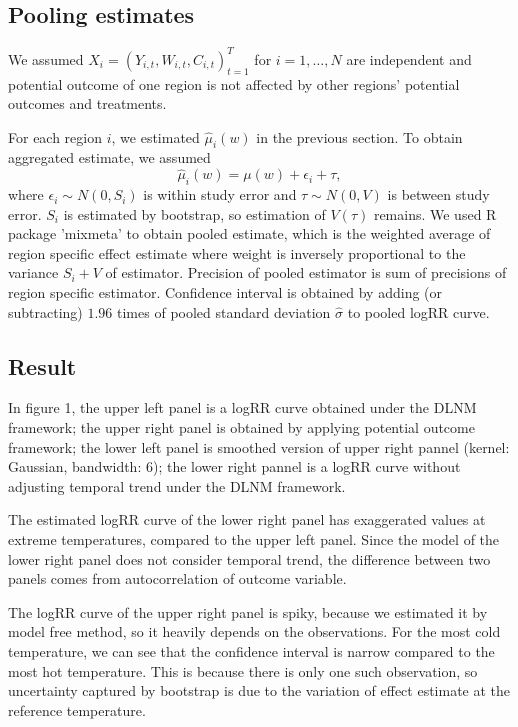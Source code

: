\documentclass[12pt]{article}
\begin{document}
\subsection{Pooling estimates}

We assumed $X_i = (Y_{i,t}, W_{i,t}, C_{i,t})_{t = 1}^T$ for $i = 1, \dots, N$ are independent
and potential outcome of one region is not affected by other regions' potential outcomes and treatments.

For each region $i$, we estimated $\hat{\mu}_i(w)$ in the previous section.
To obtain aggregated estimate, we assumed
\[
	\hat{\mu}_i(w) = \mu(w) + \epsilon_i + \tau,
\]
where $\epsilon_i \sim N(0, S_i)$ is within study error and $\tau \sim N(0, V)$ is between study error.
$S_i$ is estimated by bootstrap,
so estimation of $V(\tau)$ remains.
We used R package 'mixmeta' to obtain pooled estimate,
which is the weighted average of region specific effect estimate
where weight is inversely proportional to the variance $S_i + V$ of estimator.
Precision of pooled estimator is sum of precisions of region specific estimator.
Confidence interval is obtained by adding (or subtracting) 
$1.96$ times of pooled standard deviation $\hat{\sigma}$ to pooled logRR curve.

\subsection{Result}

In figure 1,
the upper left panel is a logRR curve obtained under the DLNM framework;
the upper right panel is obtained by applying potential outcome framework;
the lower left panel is smoothed version of upper right pannel (kernel: Gaussian, bandwidth: $6$);
the lower right pannel is a logRR curve without adjusting temporal trend under the DLNM framework.

The estimated logRR curve of the lower right panel has exaggerated values at extreme temperatures,
compared to the upper left panel.
Since the model of the lower right panel does not consider temporal trend,
the difference between two panels comes from autocorrelation of outcome variable.

The logRR curve of the upper right panel is spiky,
because we estimated it by model free method, so it heavily depends on the observations.
For the most cold temperature, 
we can see that the confidence interval is narrow compared to the most hot temperature.
This is because there is only one such observation,
so uncertainty captured by bootstrap is due to the variation of effect estimate at the reference temperature.
\end{document}
